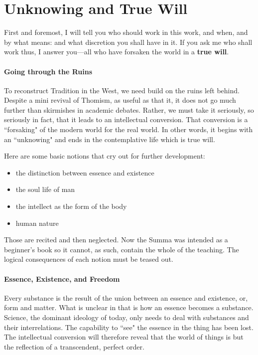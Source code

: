 \section{Unknowing and True Will}

\begin{quotex}
First and foremost, I will tell you who should work in this work, and when, and by what means: and what discretion you shall have in it. If you ask me who shall work thus, I answer you—all who have forsaken the world in a \textbf{true will}. 

\end{quotex}
\paragraph{Going through the Ruins}
To reconstruct Tradition in the West, we need build on the ruins left behind. Despite a mini revival of Thomism, as useful as that it, it does not go much further than skirmishes in academic debates. Rather, we must take it seriously, so seriously in fact, that it leads to an intellectual conversion. That conversion is a ``forsaking" of the modern world for the real world. In other words, it begins with an ``unknowing" and ends in the contemplative life which is true will.

Here are some basic notions that cry out for further development:

\begin{itemize}
\item the distinction between essence and existence 
\item the soul life of man 
\item the intellect as the form of the body 
\item human nature 
\end{itemize}
Those are recited and then neglected. Now the Summa was intended as a beginner's book so it cannot, as such, contain the whole of the teaching. The logical consequences of each notion must be teased out.

\paragraph{Essence, Existence, and Freedom}
Every substance is the result of the union between an essence and existence, or, form and matter. What is unclear in that is how an essence becomes a substance. Science, the dominant ideology of today, only needs to deal with substances and their interrelations. The capability to ``see" the essence in the thing has been lost. The intellectual conversion will therefore reveal that the world of things is but the reflection of a transcendent, perfect order.


